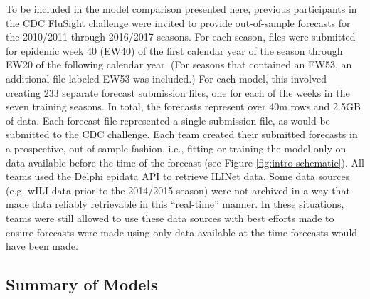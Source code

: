 \documentclass{article}\usepackage[]{graphicx}\usepackage[]{color}
\begin{document}
To be included in the model comparison presented here, previous participants in the CDC FluSight challenge were invited to provide out-of-sample forecasts for the 2010/2011 through 2016/2017 seasons.
For each season, files were submitted for epidemic week 40 (EW40) of the first calendar year of the season through EW20 of the following calendar year. 
(For seasons that contained an EW53, an additional file labeled EW53 was included.)
For each model, this involved creating 233 separate forecast submission files, one for each of the weeks in the seven training seasons.
In total, the forecasts represent over 40m rows and 2.5GB of data.
Each forecast file represented a single submission file, as would be submitted to the CDC challenge. 
Each team created their submitted forecasts in a prospective, out-of-sample fashion, i.e., fitting or training the model only on data available before the time of the forecast (see Figure \ref{fig:intro-schematic}). 
All teams used the Delphi epidata API to retrieve ILINet data.\cite{DELPHI}
Some data sources (e.g. wILI data prior to the 2014/2015 season) were not archived in a way that made data reliably retrievable in this ``real-time'' manner. 
In these situations, teams were still allowed to use these data sources with best efforts made to ensure forecasts were made using only data available at the time forecasts would have been made.

\subsection*{Summary of Models}
\end{document}
